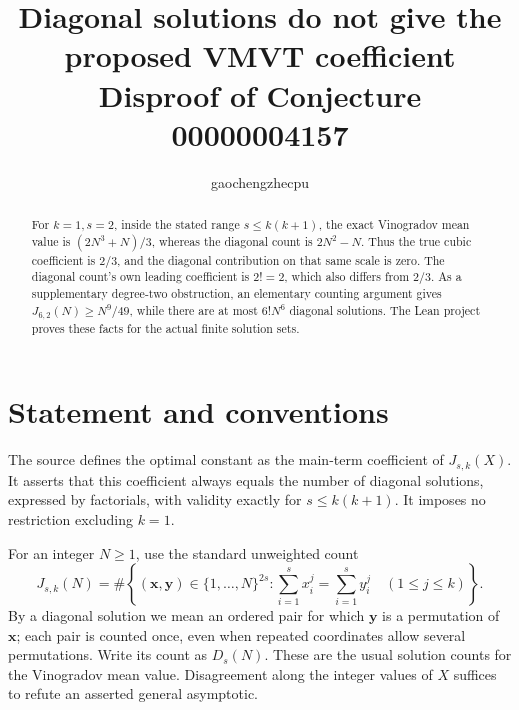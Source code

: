 \documentclass[11pt]{article}
\title{Diagonal solutions do not give the proposed VMVT coefficient\\
\large Disproof of Conjecture 00000004157}
\author{gaochengzhecpu}
\date{}
\begin{document}
\maketitle
\begin{abstract}
For $k=1,s=2$, inside the stated range $s\leq k(k+1)$, the exact Vinogradov mean value is $(2N^3+N)/3$, whereas the diagonal count is $2N^2-N$. Thus the true cubic coefficient is $2/3$, and the diagonal contribution on that same scale is zero. The diagonal count's own leading coefficient is $2!=2$, which also differs from $2/3$. As a supplementary degree-two obstruction, an elementary counting argument gives $J_{6,2}(N)\geq N^9/49$, while there are at most $6!N^6$ diagonal solutions. The Lean project proves these facts for the actual finite solution sets.
\end{abstract}

\section*{Statement and conventions}
The source defines the optimal constant as the main-term coefficient of $J_{s,k}(X)$. It asserts that this coefficient always equals the number of diagonal solutions, expressed by factorials, with validity exactly for $s\leq k(k+1)$. It imposes no restriction excluding $k=1$.

For an integer $N\geq1$, use the standard unweighted count
\[
 J_{s,k}(N)=\#\left\{(\boldsymbol x,\boldsymbol y)\in\{1,\ldots,N\}^{2s}:
 \sum_{i=1}^s x_i^j=\sum_{i=1}^s y_i^j\quad(1\leq j\leq k)\right\}.
\]
By a diagonal solution we mean an ordered pair for which $\boldsymbol y$ is a permutation of $\boldsymbol x$; each pair is counted once, even when repeated coordinates allow several permutations. Write its count as $D_s(N)$. These are the usual solution counts for the Vinogradov mean value. Disagreement along the integer values of $X$ suffices to refute an asserted general asymptotic.
\end{document}
